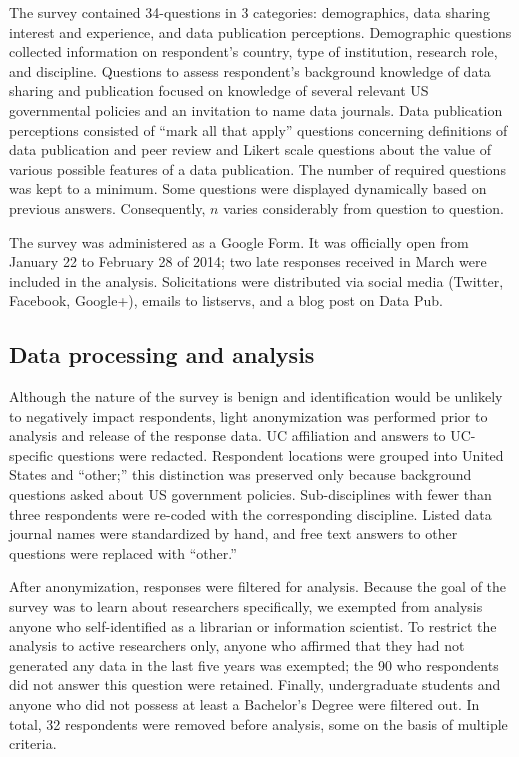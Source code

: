 \documentclass[10pt]{article}
\begin{document}
The survey contained 34-questions in 3 categories: demographics, data sharing interest and experience, and data publication perceptions.
Demographic questions collected information on respondent's country, type of institution, research role, and discipline.
Questions to assess respondent's background knowledge of data sharing and publication focused on knowledge of several relevant US governmental policies and an invitation to name data journals.
Data publication perceptions consisted of ``mark all that apply'' questions concerning definitions of data publication and peer review and Likert scale questions about the value of various possible features of a data publication.
The number of required questions was kept to a minimum.
Some questions were displayed dynamically based on previous answers. 
Consequently, $n$ varies considerably from question to question.

The survey was administered as a Google Form.
It was officially open from January 22 to February 28 of 2014; two late responses received in March were included in the analysis.
Solicitations were distributed via social media (Twitter, Facebook, Google+), emails to listservs, and a blog post on Data Pub\cite{kratz_data_2014}.

\subsection*{Data processing and analysis}
Although the nature of the survey is benign and identification would be unlikely to negatively impact respondents, light anonymization was performed prior to analysis and release of the response data.
UC affiliation and answers to UC-specific questions were redacted.
Respondent locations were grouped into United States and ``other;'' this distinction was preserved only because background questions asked about US government policies.  
Sub-disciplines with fewer than three respondents were re-coded with the corresponding discipline.
Listed data journal names were standardized by hand, and free text answers to other questions were replaced with ``other.''

After anonymization, responses were filtered for analysis.
Because the goal of the survey was to learn about researchers specifically, we exempted from analysis anyone who self-identified as a librarian or information scientist.
To restrict the analysis to active researchers only, anyone who affirmed that they had not generated any data in the last five years was exempted; the 90 who respondents did not answer this question were retained.
Finally, undergraduate students and anyone who did not possess at least a Bachelor's Degree were filtered out.
In total, 32 respondents were removed before analysis, some on the basis of multiple criteria.
\end{document}
